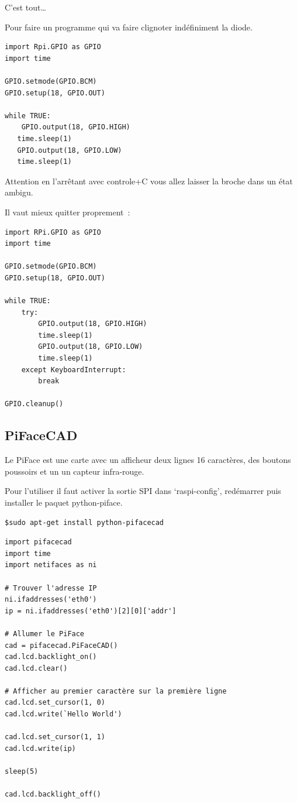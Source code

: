 C'est tout\dots

Pour faire un programme qui va faire clignoter indéfiniment la diode.

\begin{verbatim}
import Rpi.GPIO as GPIO
import time

GPIO.setmode(GPIO.BCM)
GPIO.setup(18, GPIO.OUT)

while TRUE:
    GPIO.output(18, GPIO.HIGH)
   time.sleep(1)
   GPIO.output(18, GPIO.LOW)
   time.sleep(1)
\end{verbatim} 

Attention en l'arrêtant avec controle+C vous allez laisser la broche dans un état ambigu.

Il vaut mieux quitter proprement~:

\begin{verbatim}
import RPi.GPIO as GPIO
import time

GPIO.setmode(GPIO.BCM)
GPIO.setup(18, GPIO.OUT)

while TRUE:
    try:
        GPIO.output(18, GPIO.HIGH)
        time.sleep(1)
        GPIO.output(18, GPIO.LOW)
        time.sleep(1)
    except KeyboardInterrupt:
        break

GPIO.cleanup()
\end{verbatim}

 \subsection{PiFaceCAD}
 
 Le PiFace est une carte avec un afficheur deux lignes 16 caractères, des boutons poussoirs et un un capteur infra-rouge.
 
Pour l'utiliser il faut activer la sortie SPI dans `raspi-config', redémarrer puis installer le paquet python-piface.

\begin{verbatim}
$sudo apt-get install python-pifacecad
\end{verbatim}
 
 \begin{verbatim}
import pifacecad
import time
import netifaces as ni

# Trouver l'adresse IP
ni.ifaddresses('eth0')
ip = ni.ifaddresses('eth0')[2][0]['addr']

# Allumer le PiFace
cad = pifacecad.PiFaceCAD()
cad.lcd.backlight_on()
cad.lcd.clear()

# Afficher au premier caractère sur la première ligne
cad.lcd.set_cursor(1, 0)        
cad.lcd.write(`Hello World')

cad.lcd.set_cursor(1, 1)        
cad.lcd.write(ip)

sleep(5)

cad.lcd.backlight_off()

\end{verbatim}

